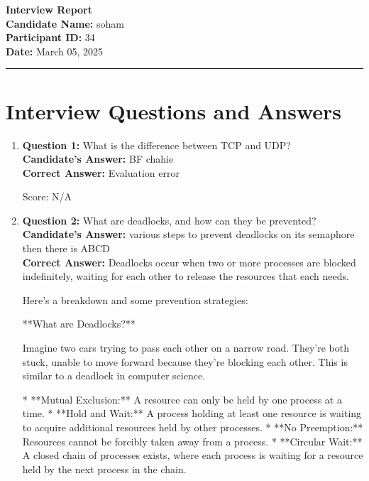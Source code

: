 \documentclass[a4paper,12pt]{article}
\newcommand{\sectionline}{\noindent\rule{\linewidth}{1pt}}
\begin{document}
\begin{center}
    \textbf{\LARGE\color{prepai-blue} Interview Report}\\[1em]
    \textbf{Candidate Name:} soham\\
    \textbf{Participant ID:} 34\\
    \textbf{Date:} March 05, 2025\\
\end{center}

\sectionline

\section*{Interview Questions and Answers}
\begin{enumerate}
\item 
    \begin{minipage}{0.7\textwidth}
        \textbf{Question 1:} What is the difference between TCP and UDP? \\
        \textbf{Candidate's Answer:} BF chahie \\
        \textbf{Correct Answer:} Evaluation error
    \end{minipage}
    \hfill
    \begin{minipage}{0.28\textwidth}
        \begin{flushright}
            \small Score: N/A
        \end{flushright}
    \end{minipage}
\item 
    \begin{minipage}{0.7\textwidth}
        \textbf{Question 2:} What are deadlocks, and how can they be prevented? \\
        \textbf{Candidate's Answer:} various steps to prevent deadlocks on its semaphore then there is ABCD \\
        \textbf{Correct Answer:} Deadlocks occur when two or more processes are blocked indefinitely, waiting for each other to release the resources that each needs.  

Here's a breakdown and some prevention strategies:

**What are Deadlocks?**

Imagine two cars trying to pass each other on a narrow road. They're both stuck, unable to move forward because they're blocking each other. This is similar to a deadlock in computer science. 

* **Mutual Exclusion:**  A resource can only be held by one process at a time.
* **Hold and Wait:** A process holding at least one resource is waiting to acquire additional resources held by other processes.
* **No Preemption:** Resources cannot be forcibly taken away from a process.
* **Circular Wait:** A closed chain of processes exists, where each process is waiting for a resource held by the next process in the chain.


\end{minipage}
\end{enumerate}
\end{document}
